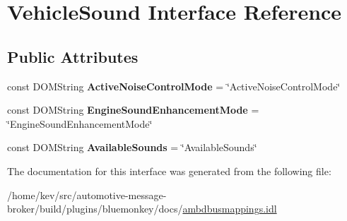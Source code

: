 \hypertarget{interfaceVehicleSound}{\section{Vehicle\+Sound Interface Reference}
\label{interfaceVehicleSound}
}
\subsection*{Public Attributes}
\begin{DoxyCompactItemize}
\item 
\hypertarget{interfaceVehicleSound_ab6d041f63822291727e44ad63e532493}{const D\+O\+M\+String {\bfseries Active\+Noise\+Control\+Mode} = \char`\"{}Active\+Noise\+Control\+Mode\char`\"{}}\label{interfaceVehicleSound_ab6d041f63822291727e44ad63e532493}

\item 
\hypertarget{interfaceVehicleSound_a8178afad26fff3ab300014500ddf2176}{const D\+O\+M\+String {\bfseries Engine\+Sound\+Enhancement\+Mode} = \char`\"{}Engine\+Sound\+Enhancement\+Mode\char`\"{}}\label{interfaceVehicleSound_a8178afad26fff3ab300014500ddf2176}

\item 
\hypertarget{interfaceVehicleSound_ae97af33f75e780803d882d0391ffa33f}{const D\+O\+M\+String {\bfseries Available\+Sounds} = \char`\"{}Available\+Sounds\char`\"{}}\label{interfaceVehicleSound_ae97af33f75e780803d882d0391ffa33f}

\end{DoxyCompactItemize}


The documentation for this interface was generated from the following file\+:\begin{DoxyCompactItemize}
\item 
/home/kev/src/automotive-\/message-\/broker/build/plugins/bluemonkey/docs/\hyperlink{ambdbusmappings_8idl}{ambdbusmappings.\+idl}\end{DoxyCompactItemize}
